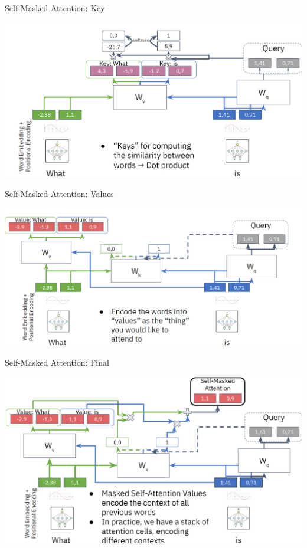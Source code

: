 \documentclass[aspectratio=169]{../latex_main/tntbeamer}  %
\begin{document}
        \begin{frame}{Self-Masked Attention: Key}

            \centering
            \includegraphics[width=0.9\linewidth]{075_deep_learning/figures/transformer9.png}
        \end{frame}
        \begin{frame}{Self-Masked Attention: Values}

            \centering
            \includegraphics[width=0.9\linewidth]{075_deep_learning/figures/transformer10.png}
        
        \end{frame}

        \begin{frame}{Self-Masked Attention: Final}

            \centering
            \vspace{-1.2em}
            \includegraphics[width=0.9\linewidth]{075_deep_learning/figures/transformer11.png}
        
        \end{frame}
\end{document}
